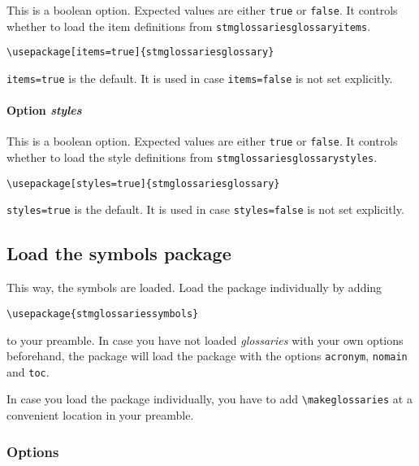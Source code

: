 \documentclass[%
  type=article,%
  layout=koma,%
  hyperref=true,%
  conditionallox=true,%
  conditionalloxnewpage=false,%
  date=true,%
  index=true,%
  listings=true%
]{stmtext}
\begin{document}
This is a boolean option. Expected values are either \texttt{true} or \texttt{false}. It controls whether to load the item definitions from \texttt{stmglossariesglossaryitems}.

\begin{verbatim}
\usepackage[items=true]{stmglossariesglossary}
\end{verbatim}

\texttt{items=true} is the default. It is used in case \texttt{items=false} is not set explicitly.

\paragraph{Option \protect\textit{styles}}

This is a boolean option. Expected values are either \texttt{true} or \texttt{false}. It controls whether to load the style definitions from \texttt{stmglossariesglossarystyles}.

\begin{verbatim}
\usepackage[styles=true]{stmglossariesglossary}
\end{verbatim}

\texttt{styles=true} is the default. It is used in case \texttt{styles=false} is not set explicitly.

\subsection{Load the symbols package}
\label{sec:usage:preamble:symbolspackage}

This way, the symbols are loaded. Load the package individually by adding

\begin{verbatim}
\usepackage{stmglossariessymbols}
\end{verbatim}

to your preamble. In case you have not loaded \textit{glossaries} with your own options beforehand, the package will load the package with the options \texttt{acronym}, \texttt{nomain} and \texttt{toc}.

In case you load the package individually, you have to add \texttt{\textbackslash makeglossaries} at a convenient location in your preamble.

\subsubsection{Options}
\end{document}
